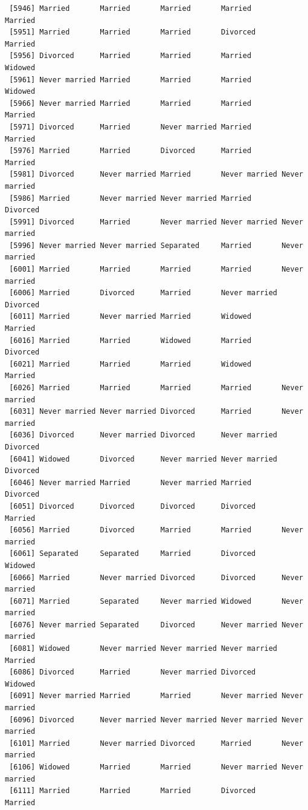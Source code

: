 \documentclass[
  letterpaper,
  DIV=11,
  numbers=noendperiod,
  oneside]{scrartcl}
\begin{document}
\begin{verbatim}
 [5946] Married       Married       Married       Married       Married      
 [5951] Married       Married       Married       Divorced      Married      
 [5956] Divorced      Married       Married       Married       Widowed      
 [5961] Never married Married       Married       Married       Widowed      
 [5966] Never married Married       Married       Married       Married      
 [5971] Divorced      Married       Never married Married       Married      
 [5976] Married       Married       Divorced      Married       Married      
 [5981] Divorced      Never married Married       Never married Never married
 [5986] Married       Never married Never married Married       Divorced     
 [5991] Divorced      Married       Never married Never married Never married
 [5996] Never married Never married Separated     Married       Never married
 [6001] Married       Married       Married       Married       Never married
 [6006] Married       Divorced      Married       Never married Divorced     
 [6011] Married       Never married Married       Widowed       Married      
 [6016] Married       Married       Widowed       Married       Divorced     
 [6021] Married       Married       Married       Widowed       Married      
 [6026] Married       Married       Married       Married       Never married
 [6031] Never married Never married Divorced      Married       Never married
 [6036] Divorced      Never married Divorced      Never married Divorced     
 [6041] Widowed       Divorced      Never married Never married Divorced     
 [6046] Never married Married       Never married Married       Divorced     
 [6051] Divorced      Divorced      Divorced      Divorced      Married      
 [6056] Married       Divorced      Married       Married       Never married
 [6061] Separated     Separated     Married       Divorced      Widowed      
 [6066] Married       Never married Divorced      Divorced      Never married
 [6071] Married       Separated     Never married Widowed       Never married
 [6076] Never married Separated     Divorced      Never married Never married
 [6081] Widowed       Never married Never married Never married Married      
 [6086] Divorced      Married       Never married Divorced      Widowed      
 [6091] Never married Married       Married       Never married Never married
 [6096] Divorced      Never married Never married Never married Never married
 [6101] Married       Never married Divorced      Married       Never married
 [6106] Widowed       Married       Married       Never married Never married
 [6111] Married       Married       Married       Divorced      Married      

\end{verbatim}
\end{document}
